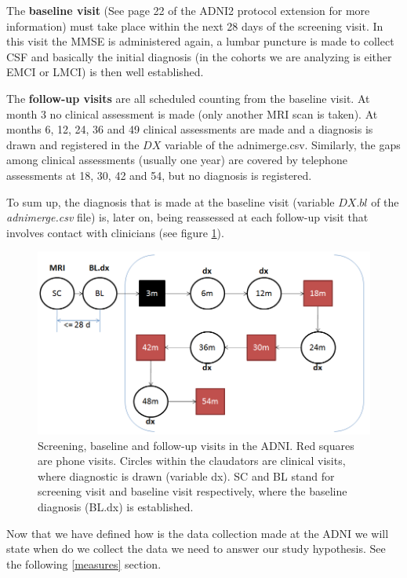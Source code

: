 \documentclass[a4paper,12pt]{elsarticle}  %
\begin{document}
The \textbf{baseline visit} (See page 22 of the ADNI2 protocol extension\cite{adni2_protocol_extension} for more information) must take place within the next 28 days of the screening visit. In this visit the MMSE is administered again, a lumbar puncture is made to collect CSF and basically the initial diagnosis (in the cohorts we are analyzing is either EMCI or LMCI) is then well established.
		
The \textbf{follow-up visits} are all scheduled counting from the baseline visit. At month 3 no clinical assessment is made (only another MRI scan is taken). At months 6, 12, 24, 36 and 49 clinical assessments are made and a diagnosis is drawn and registered in the $DX$ variable of the adnimerge.csv. Similarly, the gaps among clinical assessments (usually one year) are covered by telephone assessments at 18, 30, 42 and 54, but no diagnosis is registered.
		
To sum up, the diagnosis that is made at the baseline visit (variable $DX.bl$ of the \textit{adnimerge.csv} file) is, later on, being reassessed  at each follow-up visit that involves contact with clinicians (see figure \ref{fig:seguiments_metode}).
		
		\begin{figure}[h] 
			\centering	
			\includegraphics[width=\textwidth]{fig_seguiments_metode.png}	
			\caption{Screening, baseline and follow-up visits in the ADNI. Red squares are phone visits. Circles within the claudators are clinical visits, where diagnostic is drawn (variable dx). SC and BL stand for screening visit and baseline visit respectively, where the baseline diagnosis (BL.dx) is established.}
		\label{fig:seguiments_metode}
		\end{figure}	
		 
	
Now that we have defined how is the data collection made at the ADNI we will state when do we collect the data we need to answer our study hypothesis. See the following \ref{measures} section.
\end{document}
